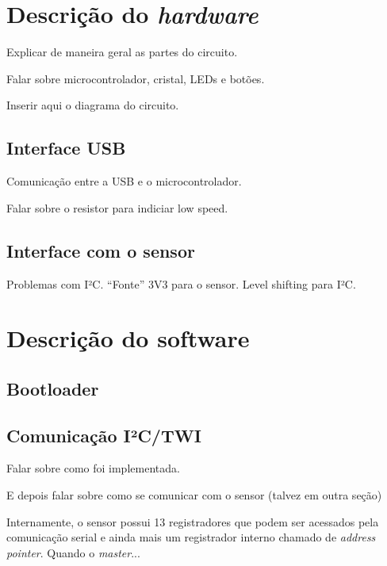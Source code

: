 \documentclass[brazil,pagestart=firstchapter]{abnt}
\begin{document}


\chapter{Descrição do \textit{hardware}\label{cap:hardware}}

Explicar de maneira geral as partes do circuito.

Falar sobre microcontrolador, cristal, LEDs e botões.

Inserir aqui o diagrama do circuito.

\section{Interface USB\label{sec:hardware_usb}}

Comunicação entre a USB e o microcontrolador.

Falar sobre o resistor para indiciar low speed.

\section{Interface com o sensor\label{sec:hardware_sensor}}

Problemas com I²C. ``Fonte'' 3V3 para o sensor. Level shifting para I²C.


\chapter{Descrição do software\label{cap:software}}

\section{Bootloader\label{sec:bootloader}}

\section{Comunicação I²C/TWI\label{sec:twi}}

Falar sobre como foi implementada.

E depois falar sobre como se comunicar com o sensor (talvez em outra seção)

Internamente, o sensor possui 13 registradores que podem ser acessados pela
comunicação serial e ainda mais um registrador interno chamado de
\textit{address pointer}. Quando o \textit{master}...
\end{document}
